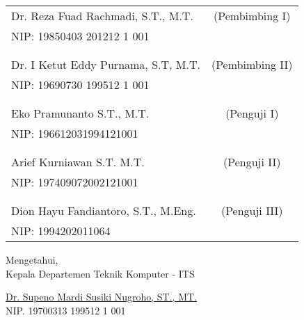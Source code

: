     \noindent
    \begin{tabularx}{\textwidth}{X c}
      Dr. Reza Fuad Rachmadi, S.T., M.T. & (Pembimbing I) \\
      NIP: 19850403 201212 1 001        &  \\
      &  \\
      &  \\
      Dr. I Ketut Eddy Purnama, S.T, M.T.  & (Pembimbing II) \\
      NIP: 19690730 199512 1 001        &  \\
      &  \\
      &  \\
      Eko Pramunanto S.T., M.T.  & (Penguji I) \\
      NIP: 196612031994121001        &  \\
      &  \\
      &  \\
      Arief Kurniawan S.T. M.T.  & (Penguji II) \\
      NIP: 197409072002121001        & \\
      &  \\
      &  \\
      Dion Hayu Fandiantoro, S.T., M.Eng. & (Penguji III) \\
      NIP: 1994202011064       & \\
    \end{tabularx}
  \endgroup

  \vspace{2ex}

  \begin{center}
    Mengetahui, \\
    Kepala Departemen Teknik Komputer - ITS \\

    \vspace{8ex}

    \underline{Dr. Supeno Mardi Susiki Nugroho, ST., MT.} \\
    NIP. 19700313 199512 1 001
  \end{center}
\endgroup
